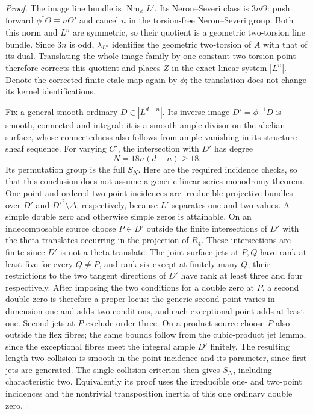 \begin{proof}
The image line bundle is $\operatorname{Nm}_\phi L'$.
Its Neron--Severi class is $3n\Theta$: push forward
$\phi^*\Theta\equiv n\Theta'$ and cancel $n$ in the torsion-free
Neron--Severi group. Both this norm and $L^n$ are symmetric, so their
quotient is a geometric two-torsion line bundle. Since $3n$ is odd,
$\lambda_{L^n}$ identifies the geometric two-torsion of $A$ with that of
its dual. Translating the whole image family by one constant two-torsion
point therefore corrects this quotient and places $Z$ in the exact
linear system $|L^n|$. Denote the corrected finite etale map again by
$\phi$; the translation does not change its kernel identifications.

Fix a general smooth ordinary $D\in|L^{d-n}|$.
Its inverse image $D'=\phi^{-1}D$ is smooth, connected and integral:
it is a smooth ample divisor on the abelian surface, whose connectedness
also follows from ample vanishing in its structure-sheaf sequence.
For varying $C'$, the intersection with $D'$ has degree
\[
                         N=18n(d-n)\ge18.
\]
Its permutation group is the full $S_N$. Here are the required incidence
checks, so that this conclusion does not assume a generic linear-series
monodromy theorem. One-point and ordered two-point incidences are
irreducible projective bundles over $D'$ and $D'^2\setminus\Delta$,
respectively, because $L'$ separates one and two values.
A simple double zero and otherwise simple zeros is attainable. On an
indecomposable source choose $P\in D'$ outside the finite intersections
of $D'$ with the theta translates occurring in the projection of $R_4$.
These intersections are finite since $D'$ is not a theta translate.
The joint surface jets at $P,Q$ have rank at least five for every
$Q\ne P$, and rank six except at finitely many $Q$; their restrictions
to the two tangent directions of $D'$ have rank at least three and
four respectively. After imposing the two conditions for a double zero
at $P$, a second double zero is therefore a proper locus: the generic
second point varies in dimension one and adds two conditions, and each
exceptional point adds at least one. Second jets at $P$ exclude order
three. On a product source choose $P$ also outside the flex fibres;
the same bounds follow from the cubic-product jet lemma, since the
exceptional fibres meet the integral ample $D'$ finitely.
The resulting length-two collision is smooth in the point incidence
and its parameter, since first jets are generated.
The single-collision criterion
\cite[Proposition~3.1, pp.~7--8 of the opened version]{Entin2021}
then gives $S_N$, including characteristic two. Equivalently its proof
uses the irreducible one- and two-point incidences and the nontrivial
transposition inertia of this one ordinary double zero.


\end{proof}

